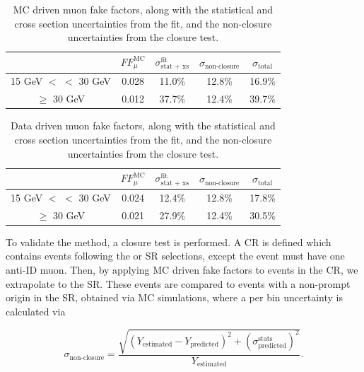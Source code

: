 \begin{table}[htp]
\centering
  \begin{tabular}{c|c|c|c|c}
    \hline
     & $FF_{\mu}^{\text{MC}}$ & $\sigma_{\text{stat + xs}}^{\text{fit}}$ & $\sigma_{\text{non-closure}}$ & $\sigma_{\text{total}}$ \\ 
     \hline
     15 GeV $<$ \pt{} $<$ 30 GeV & 0.028 & 11.0\% & 12.8\% & 16.9\%\\
     \hline
     \pt{} $\geq$ 30 GeV & 0.012 & 37.7\% & 12.4\% & 39.7\% \\
     \hline
  \end{tabular}
  \caption{MC driven muon fake factors, along with the statistical and cross section uncertainties from the fit, and the non-closure uncertainties from the closure test.}\label{tab:mc_muon_fake_factors}
\end{table}


\begin{table}[htb]
\centering
  \begin{tabular}{c|c|c|c|c}
    \hline
     & $FF_{\mu}^{\text{MC}}$ & $\sigma_{\text{stat + xs}}^{\text{fit}}$ & $\sigma_{\text{non-closure}}$ & $\sigma_{\text{total}}$ \\ 
     \hline
     15 GeV $<$ \pt{} $<$ 30 GeV & 0.024 & 12.4\% & 12.8\% & 17.8\% \\
     \hline
     \pt{} $\geq$ 30 GeV & 0.021 & 27.9\% & 12.4\% & 30.5\% \\
     \hline
  \end{tabular}
  \caption{Data driven muon fake factors, along with the statistical and cross section uncertainties from the fit, and the non-closure uncertainties from the closure test.}\label{tab:dd_muon_fake_factors}
\end{table}

To validate the method, a closure test is performed. A CR is defined which contains events following the \zdom{} or \zdep{} SR selections, except the event must have one anti-ID muon. Then, by applying MC driven fake factors to events in the CR, we extrapolate to the SR\@. These events are compared to events with a non-prompt origin in the SR, obtained via MC simulations, where a per bin uncertainty is calculated via

\begin{equation}
  \sigma_{\text{non-closure}} = \frac{\sqrt{{(Y_{\text{estimated}} - Y_{\text{predicted}})}^{2} + {(\sigma_{\text{predicted}}^{\text{stats}})}^{2} }}{Y_{\text{estimated}}}.\label{eq:non-closure_uncertainty}
\end{equation}

